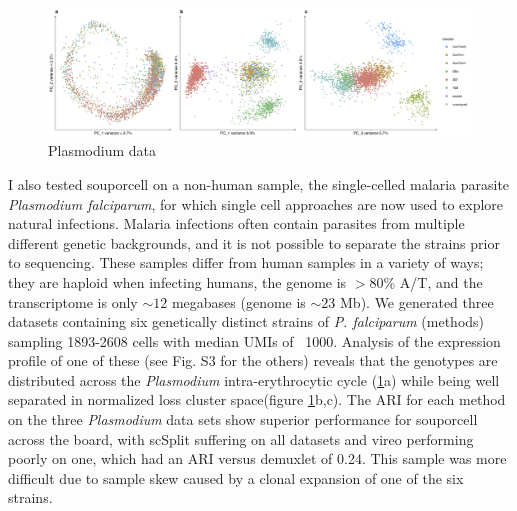 \begin{figure}[htbp!]
\caption{Plasmodium data}
\label{figure:malaria}
\begin{centering}
\includegraphics[width=\textwidth]{malaria.jpg} 
\end{centering}
\end{figure}

\par{
I also tested souporcell on a non-human sample, the single-celled malaria parasite \textit{Plasmodium falciparum}, for which single cell approaches are now used to explore natural infections\cite{MCA}. Malaria infections often contain parasites from multiple different genetic backgrounds, and it is not possible to separate the strains prior to sequencing. These samples differ from human samples in a variety of ways; they are haploid when infecting humans, the genome is $>80$\% A/T, and the transcriptome is only $\sim12$ megabases (genome is $\sim23$ Mb). We generated three datasets containing six genetically distinct strains of \textit{P. falciparum} (methods) sampling 1893-2608 cells with median UMIs of ~1000. Analysis of the expression profile of one of these (see Fig. S3 for the others) reveals that the genotypes are distributed across the \textit{Plasmodium} intra-erythrocytic cycle (\ref{figure:malaria}a) while being well separated in normalized loss cluster space(figure \ref{figure:malaria}b,c). The ARI for each method on the three \textit{Plasmodium} data sets show superior performance for souporcell across the board, with scSplit suffering on all datasets and vireo performing poorly on one, which had an ARI versus demuxlet of 0.24. This sample was more difficult due to sample skew caused by a clonal expansion of one of the six strains.
} 

